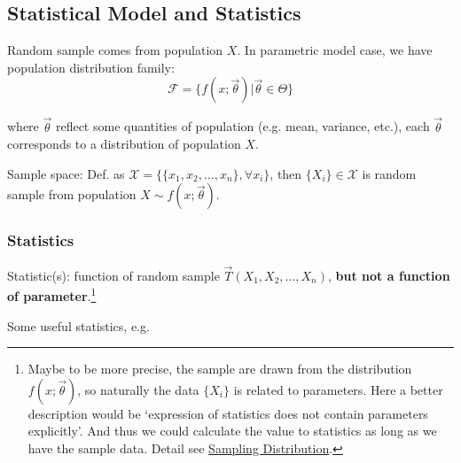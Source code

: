 \subsection{Statistical Model and Statistics}\label{SectionStatisticalModelandStatistics}
    Random sample comes from population $X$. In parametric model case, we have population distribution family:
    \begin{equation}\mathscr{F}=\{f(x;\vec{\theta})|\vec{\theta}\in\Theta\}\end{equation}

    where  $\vec{\theta}$ reflect some quantities of population (e.g. mean, variance, etc.), each $\vec{\theta}$ corresponds to a distribution of population $X$.
    
    Sample space: Def. as $\mathscr{X}=\{\{x_1,x_2,\ldots,x_n\},\forall x_i\}$, then $\{X_i\}\in\mathscr{X}$ is random sample from population $X\sim f(x;\vec{\theta})$.

    
\subsubsection{Statistics}\label{SubSectionStatistics}
    Statistic(s): function of random sample $\vec{T}(X_1,X_2,\ldots,X_n)$, \textbf{but not a function of parameter}.\footnote{Maybe to be more precise, the sample are drawn from the distribution $ f(x;\vec{\theta }) $, so naturally the data $ \{X_i\} $ is related to parameters. Here a better description would be `expression of statistics does not contain parameters explicitly'. And thus we could calculate the value to statistics as long as we have the sample data. Detail see \hyperlink{SamplingDistribution}{Sampling Distribution}.}
    
\begin{point}
    Some useful statistics, e.g.
\end{point}
    
